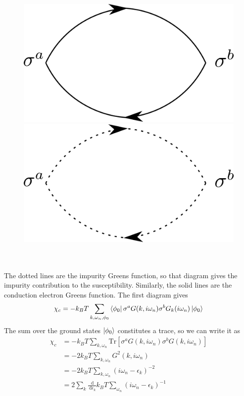 \documentclass[twoside,11pt]{report}
\numberwithin{equation}{section}
\begin{document}
\begin{figure}[tbh!]
\centering
\includegraphics[scale=0.3]{../figures/poppov1.png} 
\includegraphics[scale=0.3]{../figures/poppov2.png}
\end{figure}\\\\
The dotted lines are the impurity Greens function, so that diagram gives the impurity contribution to the susceptibility.
Similarly, the solid lines are the conduction electron Greens function.
The first diagram gives
\begin{equation}\begin{aligned}
\chi_c = -k_B T \sum_{k,\omega_n,\phi_0} \bra{\phi_0} \sigma^a G(k,i\omega_n)\sigma^bG_k(i\omega_n)\ket{\phi_0}
\end{aligned}\end{equation}
The sum over the ground states \(\ket{\phi_0}\) constitutes a trace, so we can write it as
\begin{equation}\begin{aligned}
	\chi_c &= -k_B T \sum_{k,\omega_n} \text{Tr}\left[\sigma^a G(k,i\omega_n)\sigma^bG(k,i\omega_n)\right] \\
       &= -2 k_B T \sum_{k,\omega_n} G^2(k,i\omega_n)\\
       &= -2 k_B T \sum_{k,\omega_n} \left(i\omega_n - \epsilon_k\right)^{-2}\\
       &= 2 \sum_k \frac{\:\mathrm{d}}{\:\mathrm{d}\epsilon_k}k_B T\sum_{\omega_n} \left(i\omega_n - \epsilon_k\right)^{-1}
\end{aligned}\end{equation}
\end{document}
